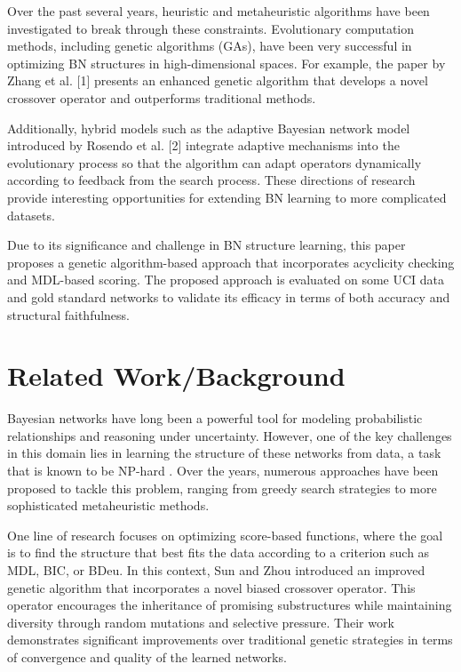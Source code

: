 \documentclass[runningheads]{llncs}
\begin{document}
Over the past several years, heuristic and metaheuristic algorithms have been investigated to break through these constraints. Evolutionary computation methods, including genetic algorithms (GAs), have been very successful in optimizing BN structures in high-dimensional spaces. For example, the paper by Zhang et al. [1] presents an enhanced genetic algorithm that develops a novel crossover operator and outperforms traditional methods.

Additionally, hybrid models such as the adaptive Bayesian network model introduced by Rosendo et al. [2] integrate adaptive mechanisms into the evolutionary process so that the algorithm can adapt operators dynamically according to feedback from the search process. These directions of research provide interesting opportunities for extending BN learning to more complicated datasets.

Due to its significance and challenge in BN structure learning, this paper proposes a genetic algorithm-based approach that incorporates acyclicity checking and MDL-based scoring. The proposed approach is evaluated on some UCI data and gold standard networks to validate its efficacy in terms of both accuracy and structural faithfulness.



\section{Related Work/Background}


Bayesian networks have long been a powerful tool for modeling probabilistic relationships and reasoning under uncertainty. However, one of the key challenges in this domain lies in learning the structure of these networks from data, a task that is known to be NP-hard \cite{chickering1996learning}. Over the years, numerous approaches have been proposed to tackle this problem, ranging from greedy search strategies to more sophisticated metaheuristic methods.

One line of research focuses on optimizing score-based functions, where the goal is to find the structure that best fits the data according to a criterion such as MDL, BIC, or BDeu. In this context, Sun and Zhou \cite{sun2022bayesian} introduced an improved genetic algorithm that incorporates a novel biased crossover operator. This operator encourages the inheritance of promising substructures while maintaining diversity through random mutations and selective pressure. Their work demonstrates significant improvements over traditional genetic strategies in terms of convergence and quality of the learned networks.
\end{document}
